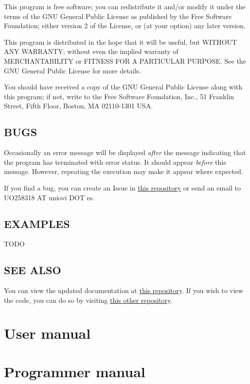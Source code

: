 This program is free software; you can redistribute it and/or modify
it under the terms of the GNU General Public License as published by
the Free Software Foundation; either version 2 of the License, or
(at your option) any later version.

This program is distributed in the hope that it will be useful,
but WITHOUT ANY WARRANTY; without even the implied warranty of
MERCHANTABILITY or FITNESS FOR A PARTICULAR PURPOSE.  See the
GNU General Public License for more details.

You should have received a copy of the GNU General Public License along with this program; if not, write to the Free Software Foundation, Inc., 51 Franklin Street, Fifth Floor, Boston, MA 02110-1301 USA.


\subsection*{BUGS}


Occasionally an error message will be displayed \textit{after} the message indicating that the program has terminated with error status. It should appear \textit{before} this message. However, repeating the execution may make it appear where expected. 

If you find a bug, you can create an Issue in \href{https://github.com/fonsecadh/classroom-manager-code}{this repository} or send an email to UO258318 AT uniovi DOT es.


\subsection*{EXAMPLES}

TODO


\subsection*{SEE ALSO}

You can view the updated documentation at \href{https://github.com/fonsecadh/classroom-manager-doc}{this repository}. If you wish to view the code, you can do so by visiting \href{https://github.com/fonsecadh/classroom-manager-code}{this other repository}.



\section{User manual}



\section{Programmer manual}

